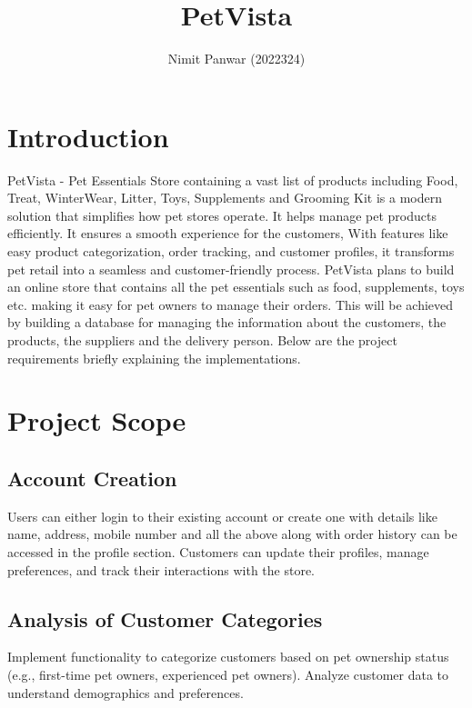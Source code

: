 \documentclass{article}
\title{PetVista}
\author{Nimit Panwar (2022324)}
\begin{document}
\maketitle

\section{Introduction}

PetVista -  Pet Essentials Store containing a vast list of products including Food, Treat, WinterWear, Litter, Toys, Supplements and Grooming Kit is a modern solution that simplifies how pet stores operate. It helps manage pet products efficiently. It ensures a smooth experience for the customers, With features like easy product categorization, order tracking, and customer profiles, it transforms pet retail into a seamless and customer-friendly process. PetVista plans to build an online store that contains all the pet essentials such as food, supplements, toys etc. making it easy for pet owners to manage their orders. This will be achieved by building a database for managing the information about the customers, the products, the suppliers and the delivery person. Below are the project requirements briefly explaining the implementations.

\section{Project Scope}

\subsection{Account Creation}

Users can either login to their existing account or create one with details like name, address, mobile number and all the above along with order history can be accessed in the profile section. Customers can update their profiles, manage preferences, and track their interactions with the store.

\subsection{Analysis of Customer Categories}

Implement functionality to categorize customers based on pet ownership status (e.g., first-time pet owners, experienced pet owners). Analyze customer data to understand demographics and preferences.
\end{document}
